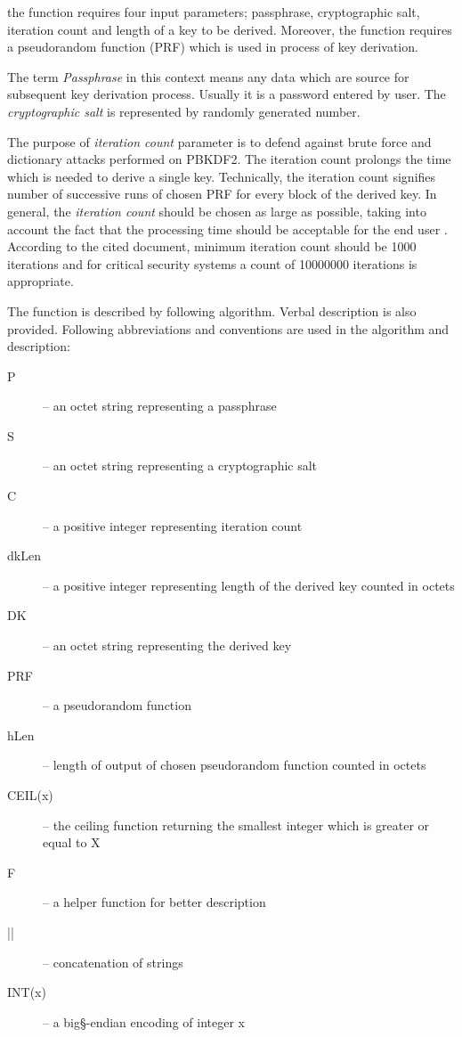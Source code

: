 \documentclass[nolof]{fithesis3}
\begin{document}
the function requires four input parameters; passphrase, cryptographic salt, iteration count and length of a key to be derived. Moreover, the function requires a pseudorandom function (PRF) which is used in process of key derivation.

The term \emph{Passphrase} in this context means any data which are source for subsequent key derivation process. Usually it is a password entered by user. The \emph{cryptographic salt} is represented by randomly generated number.

The purpose of \emph{iteration count} parameter is to defend against brute force and dictionary attacks performed on PBKDF2. The iteration count prolongs the time which is needed to derive a single key. Technically, the iteration count signifies number of successive runs of chosen PRF for every block of the derived key. In general, the \emph{iteration count} should be chosen as large as possible, taking into account the fact that the processing time should be acceptable for the end user \parencite{nistpbkdf2}. According to the cited document, minimum iteration count should be 1000 iterations and for critical security systems a count of 10000000 iterations is appropriate. 

The function is described by following algorithm. Verbal description is also provided. Following abbreviations and conventions are used in the algorithm and description:

\begin{description}
\item[P] -- an octet string representing a passphrase

\item[S] -- an octet string representing a cryptographic salt

\item[C] -- a positive integer representing iteration count

\item[dkLen] -- a positive integer representing length of the derived key counted in octets

\item[DK] -- an octet string representing the derived key

\item[PRF] -- a pseudorandom function

\item[hLen] -- length of output of chosen pseudorandom function counted in octets

\item[CEIL(x)] -- the ceiling function returning the smallest integer which is greater or equal to X

\item[F] -- a helper function for better description

\item[||] -- concatenation of strings

\item[INT(x)] -- a big§-endian encoding of integer x
\end{description}
\end{document}
